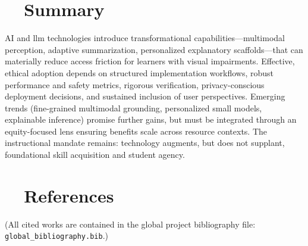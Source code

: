 \section{~~Summary}\label{ch9:sec:summary}
AI and \gls{llm} technologies introduce transformational capabilities—multimodal perception, adaptive summarization, personalized explanatory scaffolds—that can materially reduce access friction for learners with visual impairments.\supercite{SeeingAI, msseeingai, VoiceDreamScanner} Effective, ethical adoption depends on structured implementation workflows, robust performance and safety metrics, rigorous verification, privacy-conscious deployment decisions, and sustained inclusion of user perspectives.\supercite{AI_Ethics_Bias, DataPrivacyAI} Emerging trends (fine-grained multimodal grounding, personalized small models, explainable inference) promise further gains, but must be integrated through an equity-focused lens ensuring benefits scale across resource contexts. The instructional mandate remains: technology augments, but does not supplant, foundational skill acquisition and student agency.

\section{~~References}\label{ch9:sec:references}
\noindent (All cited works are contained in the global project bibliography file: \texttt{global\_bibliography.bib}.)

